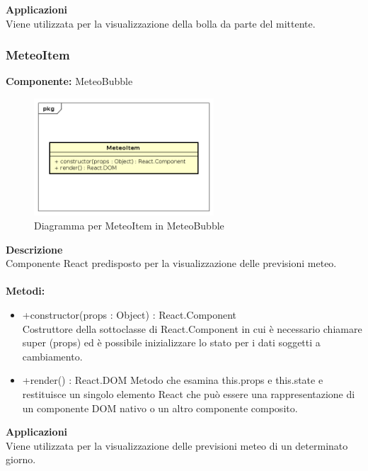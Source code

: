 \textbf{Applicazioni}\\
Viene utilizzata per la visualizzazione della bolla da parte del mittente. 


\clearpage

\subsubsection{MeteoItem}
\textbf{Componente:}  MeteoBubble\\
   \FloatBarrier
   \begin{figure}[ht]
   \centering
   \includegraphics[width=0.6\textwidth]{img/single-MeteoItem}
   \caption{{Diagramma per MeteoItem in MeteoBubble}}
\end{figure}
\FloatBarrier
\textbf{Descrizione}\\
Componente React predisposto per la visualizzazione delle previsioni meteo.
\\
\\
\textbf{Metodi:} 
\begin{itemize}
\item +constructor(props : Object) : React.Component 
\\
Costruttore della sottoclasse di React.Component in cui è necessario chiamare super (props) ed è possibile inizializzare lo stato per i dati soggetti a cambiamento.

\item +render() : React.DOM
Metodo che esamina this.props e this.state e restituisce un singolo elemento React che può essere una rappresentazione di un componente DOM nativo o un altro componente composito.

\end{itemize} 


\textbf{Applicazioni}\\
Viene utilizzata per la visualizzazione delle previsioni meteo di un determinato giorno. 


\clearpage

